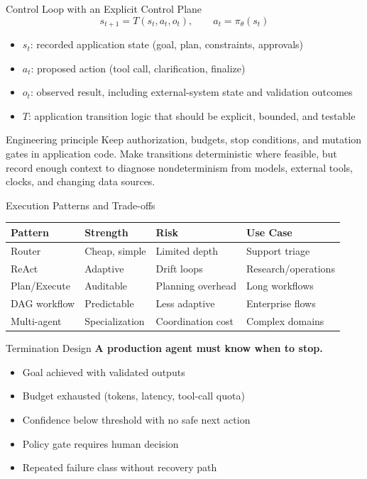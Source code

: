\documentclass[aspectratio=169]{beamer}
\begin{document}
\begin{frame}{Control Loop with an Explicit Control Plane}
  \begin{equation*}
    s_{t+1} = T(s_t, a_t, o_t), \qquad a_t = \pi_\theta(s_t)
  \end{equation*}

  \begin{itemize}
    \item $s_t$: recorded application state (goal, plan, constraints, approvals)
    \item $a_t$: proposed action (tool call, clarification, finalize)
    \item $o_t$: observed result, including external-system state and validation outcomes
    \item $T$: application transition logic that should be explicit, bounded, and testable
  \end{itemize}

  \begin{block}{Engineering principle}
    Keep authorization, budgets, stop conditions, and mutation gates in application code. Make transitions deterministic where feasible, but record enough context to diagnose nondeterminism from models, external tools, clocks, and changing data sources.
  \end{block}
\end{frame}

\begin{frame}{Execution Patterns and Trade-offs}
  \begin{table}
    \small
    \begin{tabular}{@{}llll@{}}
      \toprule
      Pattern & Strength & Risk & Use Case \\
      \midrule
      Router & Cheap, simple & Limited depth & Support triage \\
      ReAct & Adaptive & Drift loops & Research/operations \\
      Plan/Execute & Auditable & Planning overhead & Long workflows \\
      DAG workflow & Predictable & Less adaptive & Enterprise flows \\
      Multi-agent & Specialization & Coordination cost & Complex domains \\
      \bottomrule
    \end{tabular}
  \end{table}
\end{frame}

\begin{frame}{Termination Design}
  \textbf{A production agent must know when to stop.}
  \begin{itemize}
    \item Goal achieved with validated outputs
    \item Budget exhausted (tokens, latency, tool-call quota)
    \item Confidence below threshold with no safe next action
    \item Policy gate requires human decision
    \item Repeated failure class without recovery path
  \end{itemize}
\end{frame}
\end{document}
